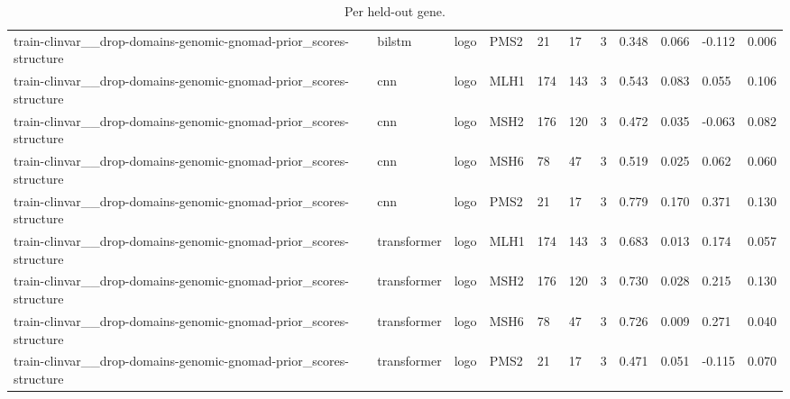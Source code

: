 \begin{table}[t]
\begin{tabular}{lllllllllll}
train-clinvar\_\_drop-domains-genomic-gnomad-prior\_scores-structure & bilstm & logo & PMS2 & 21 & 17 & 3 & 0.348 & 0.066 & -0.112 & 0.006 \\
train-clinvar\_\_drop-domains-genomic-gnomad-prior\_scores-structure & cnn & logo & MLH1 & 174 & 143 & 3 & 0.543 & 0.083 & 0.055 & 0.106 \\
train-clinvar\_\_drop-domains-genomic-gnomad-prior\_scores-structure & cnn & logo & MSH2 & 176 & 120 & 3 & 0.472 & 0.035 & -0.063 & 0.082 \\
train-clinvar\_\_drop-domains-genomic-gnomad-prior\_scores-structure & cnn & logo & MSH6 & 78 & 47 & 3 & 0.519 & 0.025 & 0.062 & 0.060 \\
train-clinvar\_\_drop-domains-genomic-gnomad-prior\_scores-structure & cnn & logo & PMS2 & 21 & 17 & 3 & 0.779 & 0.170 & 0.371 & 0.130 \\
train-clinvar\_\_drop-domains-genomic-gnomad-prior\_scores-structure & transformer & logo & MLH1 & 174 & 143 & 3 & 0.683 & 0.013 & 0.174 & 0.057 \\
train-clinvar\_\_drop-domains-genomic-gnomad-prior\_scores-structure & transformer & logo & MSH2 & 176 & 120 & 3 & 0.730 & 0.028 & 0.215 & 0.130 \\
train-clinvar\_\_drop-domains-genomic-gnomad-prior\_scores-structure & transformer & logo & MSH6 & 78 & 47 & 3 & 0.726 & 0.009 & 0.271 & 0.040 \\
train-clinvar\_\_drop-domains-genomic-gnomad-prior\_scores-structure & transformer & logo & PMS2 & 21 & 17 & 3 & 0.471 & 0.051 & -0.115 & 0.070 \\
\bottomrule
\end{tabular}
\caption{Per held-out gene.}
\label{tab:pergene}
\end{table}

